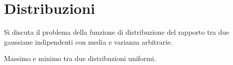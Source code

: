 \chapter{Distribuzioni}


\begin{exercise}

Si discuta il problema della funzione di distribuzione del rapporto tra
due gaussiane indipendenti con media e varianza arbitrarie.

\end{exercise}


\begin{solution}

\end{solution}



\begin{exercise}

Massimo e minimo tra due distribuzioni uniformi.

\end{exercise}


\begin{solution}

\end{solution}

